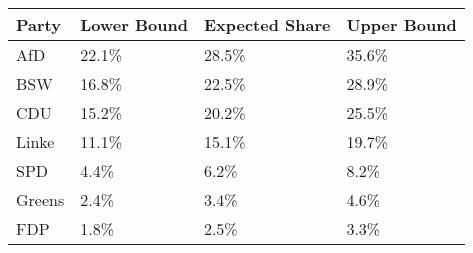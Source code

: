\begin{tabular}{llll}
  \hline
Party & Lower Bound & Expected Share & Upper Bound \\ 
  \hline
AfD & 22.1\% & 28.5\% & 35.6\% \\ 
  BSW & 16.8\% & 22.5\% & 28.9\% \\ 
  CDU & 15.2\% & 20.2\% & 25.5\% \\ 
  Linke & 11.1\% & 15.1\% & 19.7\% \\ 
  SPD & 4.4\% & 6.2\% & 8.2\% \\ 
  Greens & 2.4\% & 3.4\% & 4.6\% \\ 
  FDP & 1.8\% & 2.5\% & 3.3\% \\ 
   \hline
\end{tabular}
